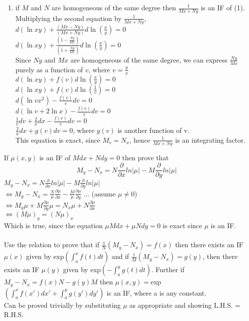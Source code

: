 \documentclass[a4paper]{article}
\begin{document}
\begin{enumerate}
{\begin{enumerate}
\item{if $M$ and $N$ are homogeneous of the same degree then $\frac{1}{Mx+Ny}$ is an IF of (1).
\\Multiplying the second equation by $\frac{1}{Mx+Ny}$,
\\$d(\ln xy) + \frac{(Mx-Ny)}{(Mx+Ny)}d\ln(\frac{x}{y})=0$
\\$d(\ln xy) + \frac{(1-\frac{Ny}{Mx})}{(1+\frac{Ny}{Mx})}d\ln(\frac{x}{y})=0$
\\Since $Ny$ and $Mx$ are homogeneous of the same degree, we can express $\frac{Ny}{Mx}$ purely as a function of $v$, where $v=\frac{y}{x}$
\\$d(\ln xy) + f(v)d\ln(\frac{x}{y})=0$
\\$d(\ln xy) + f(v)d\ln(\frac{1}{v})=0$
\\$d(\ln vx^2) - \frac{f(v)}{v}dv=0$
\\$d(\ln v + 2\ln x) - \frac{f(v)}{v}dv=0$
\\$\frac{1}{v}dv + \frac{2}{x}dx - \frac{f(v)}{v}dv=0$
\\$\frac{2}{x}dx + g(v)dv=0$, where $g(v)$ is another function of v.
\\This equation is exact, since $M_v=N_x$, hence $\frac{1}{Mx+Ny}$ is an integrating factor.
}
\end{enumerate}
\item{If $\mu(x,y)$ is an IF of $Mdx+Ndy=0$ then prove that
\[ M_y-N_x=N\frac{\partial}{\partial x}ln|\mu|-M\frac{\partial}{\partial y}ln|\mu|\]
$M_y-N_x=N\frac{\partial}{\partial x}ln|\mu|-M\frac{\partial}{\partial y}ln|\mu|$
\\$\iff M_y-N_x=\frac{N}{\mu}\frac{\partial\mu}{\partial x}-\frac{M}{\mu}\frac{\partial\mu}{\partial y}$ \hfill ... (assume $\mu\neq 0$)
\\$\iff M_y\mu+M\frac{\partial\mu}{\partial y}\mu=N_x\mu+N\frac{\partial\mu}{\partial x}$
\\$\iff (M\mu)_y=(N\mu)_x$
\\Which is true, since the equation $\mu M dx+\mu Ndy=0$ is exact since $\mu$ is an IF.
\\
\\Use the relation to prove that if $\frac{1}{N}(M_y-N_x)=f(x)$ then there exists an IF $\mu(x)$ given by exp$(\int_a ^x f(t) dt)$ and if $\frac{1}{M}(M_y-N_x)=g(y)$, then there exists an IF $\mu(y)$ given by exp$(-\int_a ^y g(t) dt)$. Further if $M_y-N_x=f(x)N-g(y)M$ then $\mu(x,y) =$exp$(\int_a^xf(x')dx'+\int_a^yg(y')dy')$ is an IF, where a is any constant.
\\Can be proved trivially by substituting $\mu$ as appropriate and showing L.H.S. = R.H.S.
}}
\end{enumerate}
\end{document}
